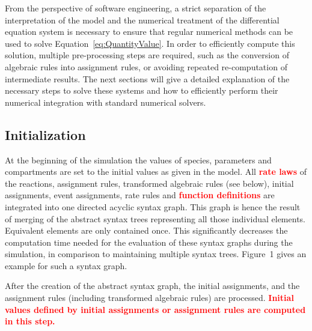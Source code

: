 \documentclass[10pt]{bmc_article}
\newenvironment{bmcformat}{\baselineskip20pt\sloppy\setboolean{publ}{false}}{\baselineskip20pt\sloppy}
\newcommand{\TODO}[1]{\textcolor{red}{\textbf{#1}}}
\begin{document}
\begin{bmcformat}
From the perspective of software engineering, a strict separation of the 
interpretation of the model and the numerical treatment of the differential
equation system is necessary to ensure that regular numerical methods can be used
to solve Equation~\ref{eq:QuantityValue}.
In order to efficiently compute this solution, multiple pre-processing steps are
required, such as the conversion of algebraic rules into assignment rules, or
avoiding repeated re-computation of intermediate results.
The next sections will give a detailed explanation of the necessary steps to
solve these systems and how to efficiently perform their numerical integration
with standard numerical solvers.


\subsection*{Initialization}

At the beginning of the simulation the values of species, parameters and compartments are set to the initial values as given in the model. All \TODO{rate laws} of the reactions, assignment rules, transformed algebraic rules (see below), initial assignments, event assignments, rate rules and \TODO{function definitions} are integrated into one directed acyclic syntax graph. This graph is hence the result of merging of the abstract syntax trees representing all those individual elements. Equivalent elements are only contained once. This significantly decreases the computation time needed for the evaluation of these syntax graphs during the simulation, in comparison to maintaining multiple syntax trees. Figure~1 gives an example for such a syntax graph.

After the creation of the abstract syntax graph, the initial assignments, and the
assignment rules (including transformed algebraic rules) are processed.
\TODO{Initial values defined by initial assignments or assignment rules are computed in this step.}



\end{bmcformat}
\end{document}
